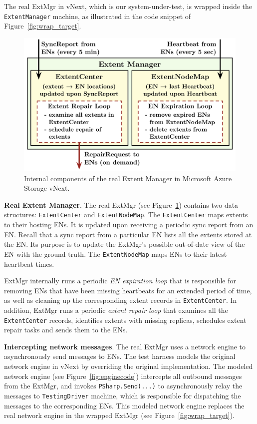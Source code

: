The real ExtMgr in vNext, which is our system-under-test, is wrapped inside the \texttt{ExtentManager} machine, as illustrated in the code snippet of Figure~\ref{fig:wrap_target}.

\begin{figure}[t]
\centering
\includegraphics[width=.95\linewidth]{img/extent_manager}
\vspace{-3mm}
\caption{Internal components of the real Extent Manager in Microsoft Azure Storage vNext.}
\label{fig:extentmanager}
\vspace{-3mm}
\end{figure}

\textbf{Real Extent Manager}.
The real ExtMgr (see Figure~\ref{fig:extentmanager}) contains two data structures: \texttt{ExtentCenter} and \texttt{ExtentNodeMap}. The \texttt{ExtentCenter} maps extents to their hosting ENs. It is updated upon receiving a periodic sync report from an EN. Recall that a sync report from a particular EN lists all the extents stored at the EN. Its purpose is to update the ExtMgr's possible out-of-date view of the EN with the ground truth. The \texttt{ExtentNodeMap} maps ENs to their latest heartbeat times.

ExtMgr internally runs a periodic \emph{EN expiration loop} that is responsible for removing ENs that have been missing heartbeats for an extended period of time, as well as cleaning up the corresponding extent records in \texttt{ExtentCenter}. In addition, ExtMgr runs a periodic \emph{extent repair loop} that examines all the \texttt{ExtentCenter} records, identifies extents with missing replicas, schedules extent repair tasks and sends them to the ENs.

\textbf{Intercepting network messages}.
The real ExtMgr uses a network engine to asynchronously send messages to ENs. The \psharp test harness models the original network engine in vNext by overriding the original implementation. The modeled network engine (see Figure~\ref{fig:enginecode}) intercepts all outbound messages from the ExtMgr, and invokes \texttt{PSharp.Send(...)} to asynchronously relay the messages to \texttt{TestingDriver} machine, which is responsible for dispatching the messages to the corresponding ENs. This modeled network engine replaces the real network engine in the wrapped ExtMgr (see Figure~\ref{fig:wrap_target}).

